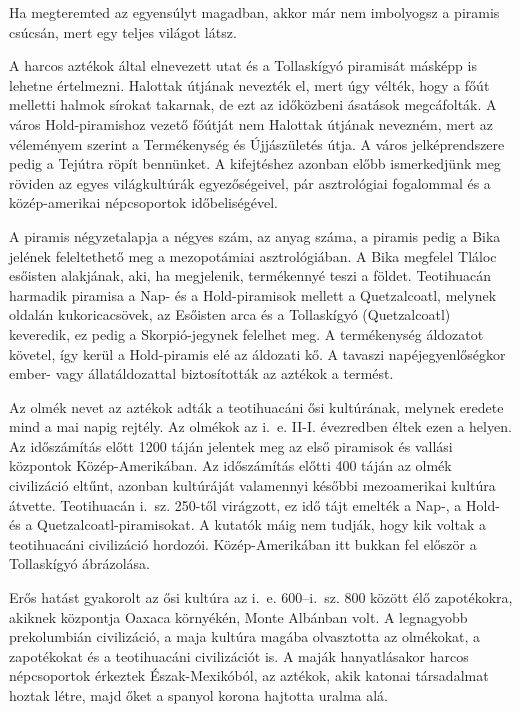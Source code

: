 \bigskip
\begin{itshape}
Ha megteremted az egyensúlyt magadban, akkor már nem imbolyogsz
a piramis csúcsán, mert egy teljes világot látsz.
\end{itshape}
\bigskip

A harcos aztékok által elnevezett utat és a Tollaskígyó piramisát
másképp is lehetne értelmezni. Halottak útjának nevezték el, mert
úgy vélték, hogy a főút melletti halmok sírokat takarnak, de ezt az
időközbeni ásatások megcáfolták. A város Hold-piramishoz vezető
főútját nem Halottak útjának nevezném, mert az véleményem szerint
a Termékenység és Újjászületés útja. A város jelképrendszere pedig a
Tejútra röpít bennünket. A kifejtéshez azonban előbb ismerkedjünk
meg röviden az egyes világkultúrák egyezőségeivel, pár asztrológiai
fogalommal és a közép-amerikai népcsoportok időbeliségével.

\bigskip
A piramis négyzetalapja a négyes szám, az anyag száma, a piramis
pedig a Bika jelének feleltethető meg a mezopotámiai asztrológiában.
A Bika megfelel Tláloc esőisten alakjának, aki, ha megjelenik,
termékennyé teszi a földet. Teotihuacán harmadik piramisa a Nap- és a
Hold-piramisok mellett a Quetzalcoatl, melynek oldalán kukoricacsövek,
az Esőisten arca és a Tollaskígyó (Quetzalcoatl) keveredik, ez pedig
a Skorpió-jegynek felelhet meg. A termékenység áldozatot követel,
így kerül a Hold-piramis elé az áldozati kő. A tavaszi napéjegyenlőségkor
ember- vagy állatáldozattal biztosították az aztékok a termést.

Az olmék nevet az aztékok adták a teotihuacáni ősi kultúrának,
melynek eredete mind a mai napig rejtély. Az olmékok az i.~e. II-I.
évezredben éltek ezen a helyen. Az időszámítás előtt 1200 táján jelentek
meg az első piramisok és vallási központok Közép-Amerikában.
Az időszámítás előtti 400 táján az olmék civilizáció eltűnt, azonban
kultúráját valamennyi későbbi mezoamerikai kultúra átvette. Teotihuacán
i.~sz. 250-től virágzott, ez idő tájt emelték a Nap-, a Hold- és a
Quetzalcoatl-piramisokat. A kutatók máig nem tudják, hogy kik voltak
a teotihuacáni civilizáció hordozói. Közép-Amerikában itt bukkan
fel először a Tollaskígyó ábrázolása.

Erős hatást gyakorolt az ősi kultúra az i.~e. 600--i.~sz. 800 között élő
zapotékokra, akiknek központja Oaxaca környékén, Monte Albánban
volt. A legnagyobb prekolumbián civilizáció, a maja kultúra magába
olvasztotta az olmékokat, a zapotékokat és a teotihuacáni civilizációt
is. A maják hanyatlásakor harcos népcsoportok érkeztek Észak-Mexikóból,
az aztékok, akik katonai társadalmat hoztak létre, majd őket a
spanyol korona hajtotta uralma alá.

